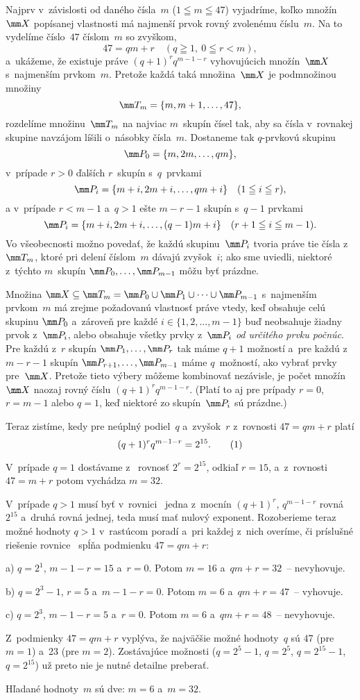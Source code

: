 {%
Najprv v~závislosti od daného čísla~$m$ ($1\leqq m\leqq 47$)
vyjadríme, koľko množín~$\mm X$ popísanej vlastnosti má najmenší
prvok rovný zvolenému číslu~$m$. Na to vydelíme číslo~$47$
číslom~$m$ so zvyškom,
$$
47=qm+r\quad (q\geqq1,\ 0\leqq r<m),
$$
a~ukážeme, že existuje práve $(q+1)^rq^{m-1-r}$ vyhovujúcich
množín~$\mm X$ s~najmenším prvkom~$m$.
Pretože každá taká množina~$\mm X$ je
podmnožinou množiny
$$
\mm T_m=\{m,m+1,\dots,47\},
$$
rozdelíme množinu~$\mm T_m$ na najviac $m$~skupín čísel tak, aby
sa čísla v~rovnakej skupine navzájom líšili o~násobky čísla~$m$.
Dostaneme tak $q$-prvkovú skupinu
$$
\mm P_0=\{m,2m,\dots,qm\},
$$
v~prípade $r>0$ ďalších $r$~skupín
s~$q$~prvkami
$$
\mm P_i=\{m+i,2m+i,\dots,qm+i\}\quad (1\leqq i\leqq r),
$$
a v~prípade $r<m-1$ a~$q>1$ ešte $m-r-1$ skupín
s~$q-1$ prvkami
$$
\mm P_i=\{m+i,2m+i,\dots,(q-1)m+i\}\quad(r+1\leqq i\leqq m-1).
$$
Vo všeobecnosti možno povedať, že každú skupinu~$\mm P_i$ tvoria práve tie
čísla z~$\mm T_m$, ktoré pri delení číslom~$m$ dávajú zvyšok~$i$;
ako sme uviedli, niektoré z~týchto $m$~skupín $\mm P_0,\dots,\mm
P_{m-1}$ môžu byť prázdne.

Množina $\mm X\subseteq \mm T_m=\mm P_0\cup \mm P_1\cup\dots\cup
\mm P_{m-1}$ s~najmenším prvkom~$m$ má zrejme požadovanú
vlastnosť práve vtedy, keď obsahuje celú skupinu $\mm P_0$ a~zároveň
pre každé $i\in\{1,2,\dots,m-1\}$ buď neobsahuje žiadny prvok
z~$\mm P_i$, alebo obsahuje všetky prvky z~$\mm P_i$ {\it od
určitého prvku počnúc}. Pre každú z~$r$ skupín $\mm
P_1,\dots,\mm P_{r}$ tak máme $q+1$ možností a~pre každú
z~$m-r-1$ skupín $\mm P_{r+1},\dots,\mm P_{m-1}$ máme $q$~možností,
ako vybrať prvky pre~$\mm X$. Pretože tieto výbery
môžeme kombinovať nezávisle, je počet množín~$\mm X$ naozaj
rovný číslu $(q+1)^rq^{m-1-r}$. (Platí to aj pre prípady $r=0$,
$r=m-1$ alebo $q=1$, keď niektoré zo skupín~$\mm P_i$ sú
prázdne.)

Teraz zistíme, kedy pre neúplný podiel~$q$ a~zvyšok~$r$
z~rovnosti $47=qm+r$ platí
$$
(q+1)^rq^{m-1-r}=2^{15}.         \tag1
$$

V~prípade $q=1$ dostávame z~ rovnosť $2^r=2^{15}$, odkiaľ
$r=15$, a~z~rovnosti $47=m+r$ potom vychádza $m=32$.

V~prípade $q>1$ musí byť v~rovnici~ jedna z~mocnín
$(q+1)^r$, $q^{m-1-r}$ rovná $2^{15}$ a~druhá rovná jednej, teda
musí mať nulový exponent. Rozoberieme teraz možné hodnoty $q>1$
v~rastúcom poradí a~pri každej z~nich overíme, či príslušné
riešenie rovnice~ spĺňa podmienku $47=qm+r$:

a) $q=2^1$, $m-1-r=15$ a~$r=0$. Potom $m=16$ a~$qm+r=32$~--
nevyhovuje.

b) $q=2^3-1$, $r=5$ a~$m-1-r=0$. Potom $m=6$ a~$qm+r=47$~--
vyhovuje.

c) $q=2^3$, $m-1-r=5$ a~$r=0$. Potom $m=6$ a~$qm+r=48$~--
nevyhovuje.

Z~podmienky $47=qm+r$ vyplýva, že najväčšie možné hodnoty~$q$ sú 47
(pre $m=1$) a~23 (pre $m=2$). Zostávajúce možnosti
($q=2^5-1$, $q=2^5$, $q=2^{15}-1$, $q=2^{15}$)
už preto nie je nutné detailne preberať.

\odpoved
Hľadané hodnoty~$m$ sú dve: $m=6$ a~$m=32$.}

